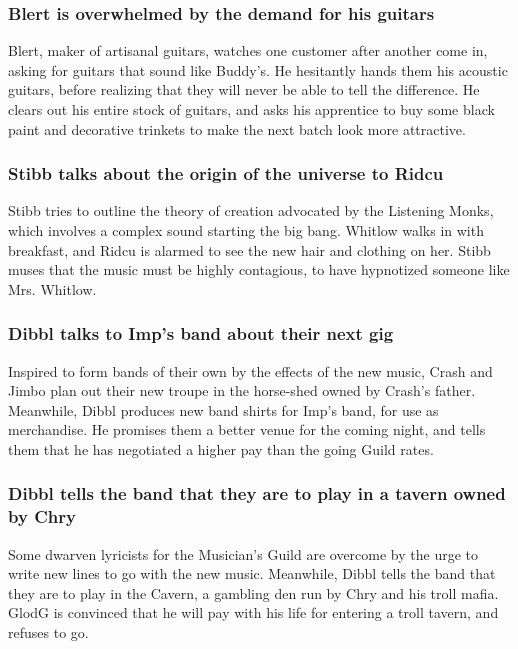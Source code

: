 \subsubsection{\Gls{Blert} is overwhelmed by the demand for his guitars}
\Gls{Blert}, maker of artisanal guitars, watches one customer after another come in, asking for
guitars that sound like \Gls{Buddy}'s. He hesitantly hands them his acoustic guitars, before
realizing that they will never be able to tell the difference. He clears out his entire stock of
guitars, and asks his apprentice to buy some black paint and decorative trinkets to make the next
batch look more attractive.

\subsubsection{\Gls{Stibb} talks about the origin of the universe to \Gls{Ridcu}}
\Gls{Stibb} tries to outline the theory of creation advocated by the Listening Monks, which involves
a complex sound starting the big bang. \Gls{Whitlow} walks in with breakfast, and \Gls{Ridcu} is
alarmed to see the new hair and clothing on her. \Gls{Stibb} muses that the music must be highly
contagious, to have hypnotized someone like Mrs. \Gls{Whitlow}.

\subsubsection{\Gls{Dibbl} talks to \Gls{Imp}'s band about their next gig}
Inspired to form bands of their own by the effects of the new music, \Gls{Crash} and \Gls{Jimbo}
plan out their new troupe in the horse-shed owned by \Gls{Crash}'s father. Meanwhile, \Gls{Dibbl}
produces new band shirts for \Gls{Imp}'s band, for use as merchandise. He promises them a better
venue for the coming night, and tells them that he has negotiated a higher pay than the going
Guild rates.

\subsubsection{\Gls{Dibbl} tells the band that they are to play in a tavern owned by \Gls{Chry}}
Some dwarven lyricists for the Musician's Guild are overcome by the urge to write new lines to go
with the new music. Meanwhile, \Gls{Dibbl} tells the band that they are to play in the Cavern, a
gambling den run by \Gls{Chry} and his troll mafia. \Gls{GlodG} is convinced that he will pay with
his life for entering a troll tavern, and refuses to go.

